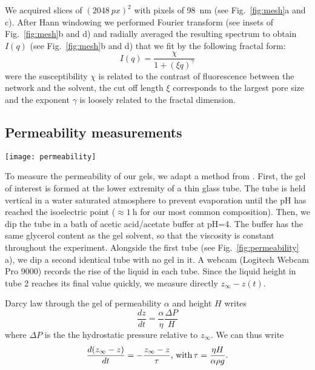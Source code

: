\documentclass[twocolumn,superscriptaddress,showpacs,preprintnumbers,
amsmath,amssymb,prl]{revtex4-1}
\begin{document}
We acquired slices of $(\SI{2048}{px})^2$ with pixels of \SI{98}{\nano\metre} (see Fig.~\ref{fig:mesh}a and c). After Hann windowing we performed Fourier transform (see insets of Fig.~\ref{fig:mesh}b and d) and radially averaged the resulting spectrum to obtain $I(q)$ (see Fig.~\ref{fig:mesh}b and d) that we fit by the following fractal form:
\begin{equation}
I(q) = \frac{\chi}{1+(\xi q)^\gamma}
\end{equation}
were the susceptibility $\chi$ is related to the contrast of fluorescence between the network and the solvent, the cut off length $\xi$ corresponds to the largest pore size and the exponent $\gamma$ is loosely related to the fractal dimension. 

\subsection*{Permeability measurements}
\begin{figure*}
	\texttt{[image: permeability]}
	\caption{Permeability measurements. (a) Schematic representation of the experiment. (b-c) Evolution of the height of the interface in tube 1 relative to the final height in tube 2. Black line is the best exponential fit $Ae^{-t/\tau}$. (b) Gel is 4\%w casein, 4\%w GDL in water, $H=\SI{2.3}{\milli\metre}$ and $\tau=\SI{57}{\minute}$. (c) Idem in 50\%w glycerol, $H=\SI{4}{\milli\metre}$ and $\tau=\SI{100}{\hour}$.}
	\label{fig:permeability}
\end{figure*}

To measure the permeability of our gels, we adapt a method from \cite{VanDijk1986}. First, the gel of interest is formed at the lower extremity of a thin glass tube. The tube is held vertical in a water saturated atmosphere to prevent evaporation until the pH has reached the isoelectric point ($\approx\SI{1}{\hour}$ for our most common composition). Then, we dip the tube in a bath of acetic acid/acetate buffer at pH=4. The buffer has the same glycerol content as the gel solvent, so that the viscosity is constant throughout the experiment. Alongside the first tube (see Fig.~\ref{fig:permeability} a), we dip a second identical tube with no gel in it. A webcam (Logitech Webcam Pro 9000) records the rise of the liquid in each tube. Since the liquid height in tube 2 reaches its final value quickly, we measure directly $z_\infty-z(t)$.

Darcy law through the gel of permeability $\alpha$ and height $H$ writes
\begin{equation}
\frac{dz}{dt} = \frac{\alpha}{\eta}\frac{\Delta P}{H}
\end{equation}
where $\Delta P$ is the the hydrostatic pressure relative to $z_\infty$. We can thus write
\begin{equation}
\frac{d(z_\infty-z)}{dt} = -\frac{z_\infty-z}{\tau}\text{, with\,} \tau = \frac{\eta H}{\alpha \rho g}.
\end{equation}
\end{document}
